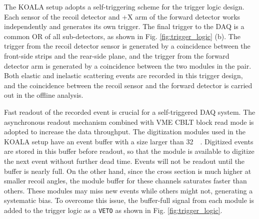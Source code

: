 \documentclass[number,5p]{elsarticle}
\begin{document}
The KOALA setup adopts a self-triggering scheme for the trigger logic design.
Each sensor of the recoil detector and +X arm of the forward detector works independently and generates its own trigger. 
The final trigger to the DAQ is a common OR of all sub-detectors, as shown in
Fig. \ref{fig:trigger_logic} (b).
The trigger from the recoil detector sensor is generated by a coincidence between the front-side strips and the rear-side plane, 
and the trigger from the forward detector arm is generated by a coincidence between the two modules in the pair.
Both elastic and inelastic scattering events are recorded in this trigger
design, and the coincidence between the recoil sensor and the forward detector
is carried out in the offline analysis.

Fast readout of the recorded event is crucial for a self-triggered DAQ system.
The asynchronous readout mechanism combined with VME CBLT block read mode is adopted to increase the data throughput.
The digitization modules used in the KOALA setup have an event buffer with a size
larger than \SI{32}{\kibi\byte}.
Digitized events are stored in this buffer before readout, so that the module is
available to digitize the next event without further dead time.
Events will not be readout until the buffer is nearly full.
On the other hand, since the cross section is much higher at smaller recoil
angles, the module buffer for these channels saturates faster than others.
These modules may miss new events while others might not, generating a systematic bias.
To overcome this issue, the buffer-full signal from each module is added to the
trigger logic as a \texttt{VETO} as shown in Fig. \ref{fig:trigger_logic}.
\end{document}
